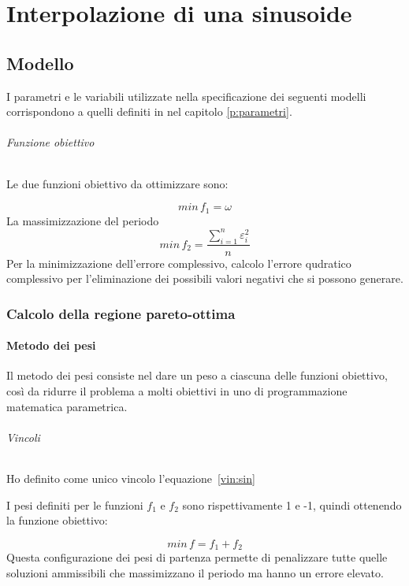 \documentclass[a4paper,12pt]{report}
\begin{document}
%
%
\chapter{Interpolazione di una sinusoide}

\section{Modello}
I parametri e le variabili utilizzate nella specificazione dei seguenti modelli corrispondono a quelli definiti in nel capitolo \ref{p:parametri}.

\subparagraph{Funzione obiettivo}
Le due funzioni obiettivo da ottimizzare sono:

\begin{equation}
\label{fo:periodo}
min \, f_1 = \omega
\end{equation}
La massimizzazione del periodo
\begin{equation}
\label{fo:errore}
min \, f_2 = \frac{\sum_{i=1}^n \varepsilon_i^2}{n}
\end{equation}
Per la minimizzazione dell'errore complessivo, calcolo l'errore qudratico complessivo per l'eliminazione dei possibili valori negativi che si possono generare.


\subsection{Calcolo della regione pareto-ottima}

\subsubsection{Metodo dei pesi}

Il metodo dei pesi consiste nel dare un peso a ciascuna delle funzioni obiettivo, così da ridurre il problema a molti obiettivi in uno di programmazione matematica parametrica.

\subparagraph{Vincoli}
Ho definito come unico vincolo l'equazione~\eqref{vin:sin}

I pesi definiti per le funzioni $ f_1 $ e $ f_2 $ sono rispettivamente 1 e -1, quindi ottenendo la funzione obiettivo:

\begin{equation}
min \, f = f_1 + f_2
\end{equation}
Questa configurazione dei pesi di partenza permette di penalizzare tutte quelle soluzioni ammissibili che massimizzano il periodo ma hanno un errore elevato.
\end{document}

